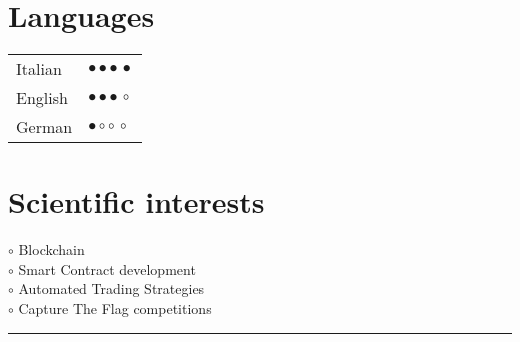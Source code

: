 \documentclass[a4paper,10pt]{article}
\newcommand{\MyVerticalRule}{%
	\textcolor{ColorOne}{\rule{1pt}{\textheight}}
}
\newcommand{\SkillBull}[1]{%
\textcolor{ColorTwo}{#1}
}
\begin{document}
\newpage
\thispagestyle{empty}

\begin{adjustbox}{valign=t}
\begin{minipage}{0.3\textwidth} %

\section*{Languages}
\begin{tabular}{ll}
    Italian	    & \SkillBull{$\bullet \bullet \bullet \, \bullet$}\\
	English		& \SkillBull{$\bullet \bullet \bullet \, \circ$}\\
	German		& \SkillBull{$\bullet \circ \circ \, \circ$}\\
\end{tabular}

\vfill

\section*{Scientific interests}
\raggedright
\textcolor{ColorOne}{$\circ$} Blockchain\\
\textcolor{ColorOne}{$\circ$} Smart Contract development\\
\textcolor{ColorOne}{$\circ$} Automated Trading Strategies\\
\textcolor{ColorOne}{$\circ$} Capture The Flag competitions

\vfill


\end{minipage}
\end{adjustbox}
%
%
%
\hfill
\begin{adjustbox}{valign=t}
\begin{minipage}{0.05\textwidth} %
\MyVerticalRule  %
\end{minipage}
\end{adjustbox}
\end{document}

